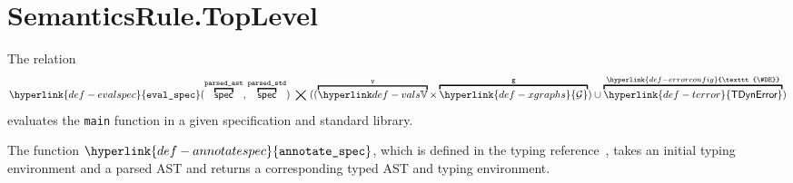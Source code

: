 \documentclass{book}
\newcommand\XGraphs[0]{\hyperlink{def-xgraphs}{\mathcal{G}}}
\newcommand\ErrorConfig[0]{\hyperlink{def-errorconfig}{\texttt{\#DE}}}
\newcommand\TError[0]{\hyperlink{def-terror}{\textsf{TDynError}}}
\newcommand\evalspec[1]{\hyperlink{def-evalspec}{\texttt{eval\_spec}}(#1)}
\newcommand\parsedstd[0]{\texttt{parsed\_std}}
\newcommand\parsedast[0]{\texttt{parsed\_ast}}
\newcommand\vg[0]{\texttt{g}}
\begin{document}
\section{SemanticsRule.TopLevel \label{sec:SemanticsRule.TopLevel}}
The relation
\hypertarget{def-evalspec}{}
\[
  \evalspec{\overname{\spec}{\parsedast}, \overname{\spec}{\parsedstd}} \;\aslrel\;
   ((\overname{\vals}{\vv}\times \overname{\XGraphs}{\vg}) \cup \overname{\TError}{\ErrorConfig})
\]
evaluates the \texttt{main} function in a given specification and standard library.

\newcommand\annotatespec[0]{\hyperlink{def-annotatespec}{\texttt{annotate\_spec}}}
\hypertarget{def-annotatespec}{}
The function $\annotatespec$, which is defined in the typing reference~\cite{ASLTypingReference},
takes an initial typing environment and a parsed AST and returns a corresponding typed AST and typing
environment.
\end{document}
